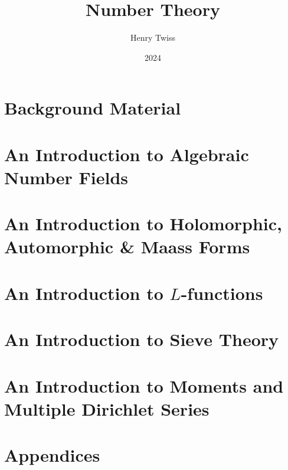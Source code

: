 \documentclass[12pt,oneside]{book}
\title{Number Theory}
\author{Henry Twiss}
\date{2024}
\begin{document}
\maketitle
\pagestyle{empty}
\tableofcontents
\setcounter{page}{0}
\pagestyle{fancy}

\part{Background Material}
  

\part{An Introduction to Algebraic Number Fields}
  

\part{An Introduction to Holomorphic, Automorphic \& Maass Forms}
  
  
  
  

\part{An Introduction to \texorpdfstring{$L$}{L}-functions}
  
  
  

\part{An Introduction to Sieve Theory}
  
  

\part{An Introduction to Moments and Multiple Dirichlet Series}
  
  

\part{Appendices}
  

\printindex


\end{document}
